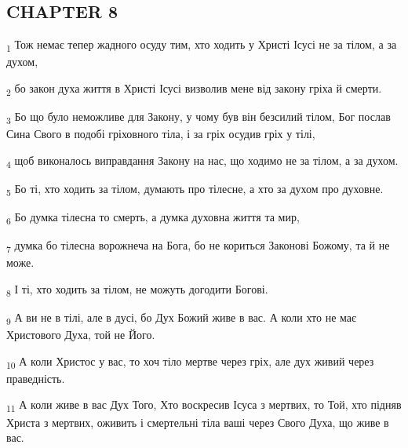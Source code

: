 \subsection{CHAPTER 8}
\begin{tcolorbox}
\textsubscript{1} Тож немає тепер жадного осуду тим, хто ходить у Христі Ісусі не за тілом, а за духом,
\end{tcolorbox}
\begin{tcolorbox}
\textsubscript{2} бо закон духа життя в Христі Ісусі визволив мене від закону гріха й смерти.
\end{tcolorbox}
\begin{tcolorbox}
\textsubscript{3} Бо що було неможливе для Закону, у чому був він безсилий тілом, Бог послав Сина Свого в подобі гріховного тіла, і за гріх осудив гріх у тілі,
\end{tcolorbox}
\begin{tcolorbox}
\textsubscript{4} щоб виконалось виправдання Закону на нас, що ходимо не за тілом, а за духом.
\end{tcolorbox}
\begin{tcolorbox}
\textsubscript{5} Бо ті, хто ходить за тілом, думають про тілесне, а хто за духом про духовне.
\end{tcolorbox}
\begin{tcolorbox}
\textsubscript{6} Бо думка тілесна то смерть, а думка духовна життя та мир,
\end{tcolorbox}
\begin{tcolorbox}
\textsubscript{7} думка бо тілесна ворожнеча на Бога, бо не кориться Законові Божому, та й не може.
\end{tcolorbox}
\begin{tcolorbox}
\textsubscript{8} І ті, хто ходить за тілом, не можуть догодити Богові.
\end{tcolorbox}
\begin{tcolorbox}
\textsubscript{9} А ви не в тілі, але в дусі, бо Дух Божий живе в вас. А коли хто не має Христового Духа, той не Його.
\end{tcolorbox}
\begin{tcolorbox}
\textsubscript{10} А коли Христос у вас, то хоч тіло мертве через гріх, але дух живий через праведність.
\end{tcolorbox}
\begin{tcolorbox}
\textsubscript{11} А коли живе в вас Дух Того, Хто воскресив Ісуса з мертвих, то Той, хто підняв Христа з мертвих, оживить і смертельні тіла ваші через Свого Духа, що живе в вас.
\end{tcolorbox}
